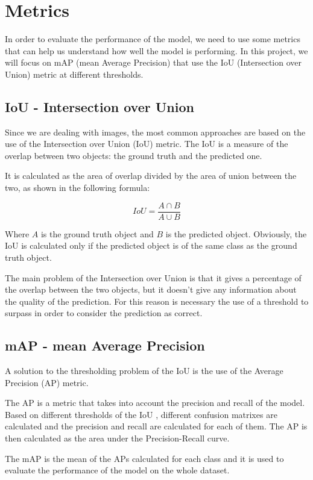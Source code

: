 \section{Metrics}
In order to evaluate the performance of the model, we need to use some metrics that can help us understand how well the model is performing.
In this project, we will focus on mAP (mean Average Precision) that use the IoU (Intersection over Union) metric at different thresholds.


\subsection*{IoU - Intersection over Union}
Since we are dealing with images, the most common approaches are based on the use of the Intersection over Union (IoU) metric. The IoU is a measure of the overlap between two objects: the ground truth and the predicted one. 

It is calculated as the area of overlap divided by the area of union between the two, as shown in the following formula:

\begin{equation}
    IoU = \frac{A \cap B}{A \cup B}
\end{equation}

Where $A$ is the ground truth object and $B$ is the predicted object. Obviously, the IoU is calculated only if the predicted object is of the same class as the ground truth object.

The main problem of the Intersection over Union is that it gives a percentage of the overlap between the two objects, but it doesn't give any information about the quality of the prediction. For this reason is necessary the use of a threshold to surpass in order to consider the prediction as correct.


\subsection*{mAP - mean Average Precision}
A solution to the thresholding problem of the IoU is the use of the Average Precision (AP) metric. 

The AP is a metric that takes into account the precision and recall of the model.
Based on different thresholds of the IoU , different confusion matrixes are calculated and the precision and recall are calculated for each of them. The AP is then calculated as the area under the Precision-Recall curve.

The mAP is the mean of the APs calculated for each class and it is used to evaluate the performance of the model on the whole dataset.
